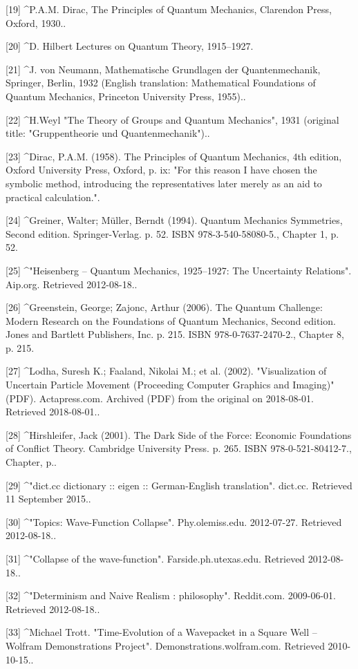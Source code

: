 [19]
^P.A.M. Dirac, The Principles of Quantum Mechanics, Clarendon Press, Oxford, 1930..

[20]
^D. Hilbert Lectures on Quantum Theory, 1915–1927.

[21]
^J. von Neumann, Mathematische Grundlagen der Quantenmechanik, Springer, Berlin, 1932 (English translation: Mathematical Foundations of Quantum Mechanics, Princeton University Press, 1955)..

[22]
^H.Weyl "The Theory of Groups and Quantum Mechanics", 1931 (original title: "Gruppentheorie und Quantenmechanik")..

[23]
^Dirac, P.A.M. (1958). The Principles of Quantum Mechanics, 4th edition, Oxford University Press, Oxford, p. ix: "For this reason I have chosen the symbolic method, introducing the representatives later merely as an aid to practical calculation.".

[24]
^Greiner, Walter; Müller, Berndt (1994). Quantum Mechanics Symmetries, Second edition. Springer-Verlag. p. 52. ISBN 978-3-540-58080-5., Chapter 1, p. 52.

[25]
^"Heisenberg – Quantum Mechanics, 1925–1927: The Uncertainty Relations". Aip.org. Retrieved 2012-08-18..

[26]
^Greenstein, George; Zajonc, Arthur (2006). The Quantum Challenge: Modern Research on the Foundations of Quantum Mechanics, Second edition. Jones and Bartlett Publishers, Inc. p. 215. ISBN 978-0-7637-2470-2., Chapter 8, p. 215.

[27]
^Lodha, Suresh K.; Faaland, Nikolai M.; et al. (2002). "Visualization of Uncertain Particle Movement (Proceeding Computer Graphics and Imaging)" (PDF). Actapress.com. Archived (PDF) from the original on 2018-08-01. Retrieved 2018-08-01..

[28]
^Hirshleifer, Jack (2001). The Dark Side of the Force: Economic Foundations of Conflict Theory. Cambridge University Press. p. 265. ISBN 978-0-521-80412-7., Chapter, p..

[29]
^"dict.cc dictionary :: eigen :: German-English translation". dict.cc. Retrieved 11 September 2015..

[30]
^"Topics: Wave-Function Collapse". Phy.olemiss.edu. 2012-07-27. Retrieved 2012-08-18..

[31]
^"Collapse of the wave-function". Farside.ph.utexas.edu. Retrieved 2012-08-18..

[32]
^"Determinism and Naive Realism : philosophy". Reddit.com. 2009-06-01. Retrieved 2012-08-18..

[33]
^Michael Trott. "Time-Evolution of a Wavepacket in a Square Well – Wolfram Demonstrations Project". Demonstrations.wolfram.com. Retrieved 2010-10-15..

